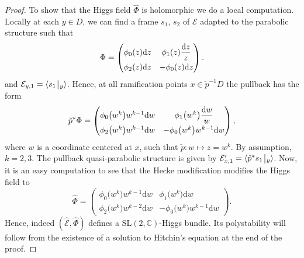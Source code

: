 \documentclass[10pt,a4paper]{amsart}
\numberwithin{equation}{section}
\theoremstyle{definition}
\newcommand{\rest}{\: \rule[-3.5pt]{0.5pt}{11.5pt}\,{}}
\newcommand{\calE}{\mathcal{E}}
\newcommand{\CC}{\mathbb{C}}
\renewcommand{\d}{\mathrm{d}}
\newcommand{\SL}{\mathrm{SL}}
\begin{document}
\begin{proof}
 To show that the Higgs field $\hat{\Phi}$ is holomorphic we do a local computation. Locally at each $y \in D$, we can find a frame $s_1$, $s_2$ of $\calE$ adapted to the parabolic structure such that
 \begin{align} \Phi= \begin{pmatrix} \phi_0(z) \d z & \phi_1(z) \dfrac{\d z}{z} \vspace{1mm}\\ \phi_2(z) \d z & -\phi_0(z) \d z \end{pmatrix}.
 \label{eq:local-model-Phi}
 \end{align}
 and $\calE_{y,1}=\langle s_1\rest_{y} \rangle$. Hence, at all ramification points $x \in \check{p}^{-1}D$ the pullback has the form
 \begin{align} \label{eq:local-model-Phi'}
 \check{p}^* \Phi= \begin{pmatrix} \phi_0\bigl(w^k\bigr) w^{k-1} \d w & \phi_1\bigl(w^k\bigr) \dfrac{ \d w}{w} \vspace{1mm}\\ \phi_2\bigl(w^k\bigr)w^{k-1} \d w & -\phi_0\bigl(w^k\bigr) w^{k-1} \d w \end{pmatrix},
 \end{align}
 where $w$ is a coordinate centered at $x$, such that $\check{p}\colon w \mapsto z=w^k$. By assumption, $k=2,3$. The pullback quasi-parabolic structure is given by $\calE'_{x,1}=\langle \check{p}^*s_1 \rest_y\rangle$. Now, it is an easy computation to see that the Hecke modification modifies the Higgs field to
 \[ \hat{\Phi} = \begin{pmatrix} \phi_0\bigl(w^k\bigr) w^{k-1} \d w & \phi_1\bigl(w^k\bigr) \d w \\[1mm] \phi_2\bigl(w^k\bigr)w^{k-2} \d w & -\phi_0\bigl(w^k\bigr) w^{k-1} \d w \end{pmatrix}.
 \]
 Hence, indeed $(\hat{\calE},\hat{\Phi})$ defines a $\SL(2,\CC)$-Higgs bundle. Its polystability will follow from the existence of a solution to Hitchin's equation at the end of the proof.


\end{proof}
\end{document}
